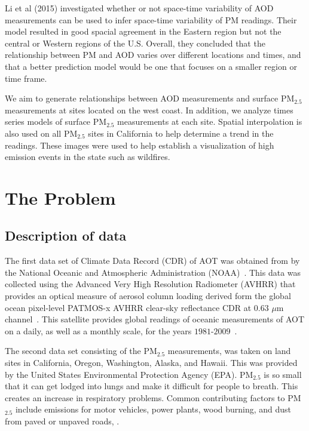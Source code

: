 \documentclass[10pt]{article}
\begin{document}
Li et al (2015) investigated whether or not space-time variability of AOD measurements can be used to infer space-time variability of PM readings. Their model resulted in good spacial agreement in the Eastern region but not the central or Western regions of the U.S. Overall, they concluded that the relationship between PM and AOD varies over different locations and times, and that a better prediction model would be one that focuses on a smaller region or time frame.

We aim to generate relationships between AOD measurements and surface PM$_{2.5}$ measurements at sites located on the west coast. In addition, we analyze times series models of surface PM$_{2.5}$ measurements at each site. Spatial interpolation is also used on all PM$_{2.5}$ sites in California to help determine a trend in the readings. These images were used to help establish a visualization of high emission events in the state such as wildfires.


\section{The Problem}





\subsection{Description of data}

The first data set of Climate Data Record (CDR) of AOT was obtained from by the National Oceanic and Atmospheric Administration (NOAA)~\cite{noaa}. This data was collected using the  Advanced Very High Resolution Radiometer (AVHRR) that provides an optical measure of aerosol column loading derived form the global ocean pixel-level PATMOS-x AVHRR clear-sky reflectance CDR at $0.63$ $\mu$m channel~\cite{noaa}. This satellite provides global readings of oceanic measurements of AOT on a daily, as well as a monthly scale, for the years $1981$-$2009$~\cite{noaa}.

The second data set consisting of the PM$_{2.5}$ measurements, was taken on land sites in California, Oregon, Washington, Alaska, and Hawaii. This was provided by the United States Environmental Protection Agency (EPA).   PM$_{2.5}$ is so small that it can get lodged into lungs and make it difficult for people to breath. This creates an increase in respiratory problems. Common contributing factors to PM$_{2.5}$ include emissions for motor vehicles, power plants, wood burning, and dust from paved or unpaved roads, \cite{epa}.
\end{document}
